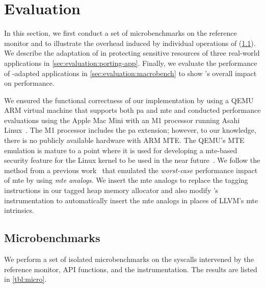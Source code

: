 \section{Evaluation}

\label{sec:evaluation}

In this section, we first conduct a set of microbenchmarks on the reference monitor and \libcapac to illustrate the overhead induced by individual operations of \thename (\cref{sec:evaluation:mon-microbench}).
We describe the adaptation of \thename in protecting sensitive resources of three real-world applications in \cref{sec:evaluation:porting-app}.
Finally, we evaluate the performance of \thename-adapted applications in \cref{sec:evaluation:macrobench} to show \thename's overall impact on performance.

 We ensured the functional correctness of our implementation by using a QEMU~\cite{qemu} ARM virtual machine that supports both \gls{pa} and \gls{mte} and conducted performance evaluations using the Apple Mac Mini with an M1 processor running Asahi Linux~\cite{asahi-linux}.
The M1 processor includes the \gls{pa} extension; however, to our knowledge, there is no publicly available hardware with ARM MTE.
The QEMU's MTE emulation is mature to a point where it is used for developing a \gls{mte}-based security feature for the Linux kernel to be used in the near future~\cite{kasan}.
We follow the method from a previous work~\cite{hakc} that emulated the \emph{worst-case} performance impact of \gls{mte} by using \emph{\gls{mte} analogs}.
We insert the \gls{mte} analogs to replace the tagging instructions in our tagged heap memory allocator and also modify \thename's instrumentation to automatically insert the \gls{mte} analogs in places of LLVM's \gls{mte} intrinsics.







\subsection{Microbenchmarks}
\label{sec:evaluation:mon-microbench}
We perform a set of isolated microbenchmarks on the syscalls intervened by the reference monitor, \libcapac API functions, and the instrumentation. The results are listed in \autoref{tbl:micro}.





